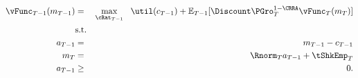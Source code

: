 \begin{eqnarray*}
{\vFunc}_{T-1}({m}_{T-1}) & = & \max_{\cRat_{T-1}} ~~ \util({c}_{T-1}) + \Ex_{T-1} [\Discount \PGro_{T}^{1-\CRRA}{\vFunc}_{T}({m}_{T})] \label{eq:ConstrArt}
\\ & \mbox{s.t.}&  \nonumber
\\ {a}_{T-1} & = & {m}_{T-1} - {c}_{T-1}
\\ {m}_{T} & = & \Rnorm_{T} {a}_{T-1} + \tShkEmp_{T}
\\ {a}_{T-1} & \geq & 0 .
\end{eqnarray*}
